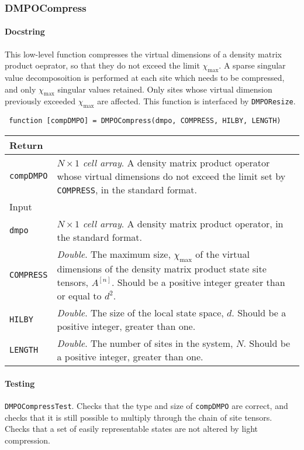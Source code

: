  \subsubsection{DMPOCompress}
 \paragraph{Docstring} This low-level function compresses the virtual dimensions of a density matrix product oeprator, so that they do not exceed the limit \(\chi_{\mathrm{max}}\). A sparse singular value decomposoition is performed at each site which needs to be compressed, and only \(\chi_{\mathrm{max}}\) singular values retained. Only sites whose virtual dimension previously exceeded \(\chi_{\mathrm{max}}\) are affected. This function is interfaced by \lstinline$DMPOResize$.
 \begin{lstlisting}
 function [compDMPO] = DMPOCompress(dmpo, COMPRESS, HILBY, LENGTH) \end{lstlisting}
 \begin{longtabu}{X[1,l]X[4,l]}
 \hline
 Return & \\ \hline
 \lstinline$compDMPO$ & \emph{\(N \times 1\) cell array}. A density matrix product operator whose virtual dimensions do not exceed the limit set by \lstinline$COMPRESS$, in the standard format. \\ \hline
 Input & \\ \hline
 \lstinline$dmpo$ & \emph{\(N \times 1\) cell array}. A density matrix product operator, in the standard format. \\
 \lstinline$COMPRESS$ & \emph{Double}. The maximum size, \(\chi_{\mathrm{max}}\) of the virtual dimensions of the density matrix product state site tensors, \(A^{[n]}\). Should be a positive integer greater than or equal to \(d^{2}\). \\
 \lstinline$HILBY$ & \emph{Double}. The size of the local state space, \(d\). Should be a positive integer, greater than one. \\
 \lstinline$LENGTH$ & \emph{Double}. The number of sites in the system, \(N\). Should be a positive integer, greater than one. \\ 
 \hline
 \end{longtabu}
 \paragraph{Testing} \lstinline$DMPOCompressTest$. Checks that the type and size of \lstinline$compDMPO$ are correct, and checks that it is still possible to multiply through the chain of site tensors. Checks that a set of easily representable states are not altered by light compression.
 
